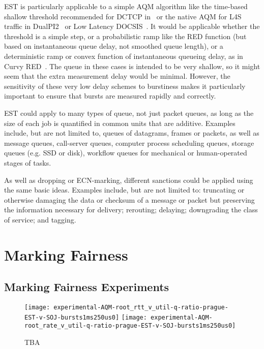 EST is particularly applicable to a simple AQM algorithm like the time-based shallow threshold recommended for DCTCP in~\cite{Bai16:MQ-ECN} or the native AQM for L4S traffic in DualPI2~\cite[Appx.\ A]{Briscoe15e:DualQ-Coupled-AQM_ID} or Low Latency DOCSIS~\cite{CableLabs:DOCSIS3.1}. It would be applicable whether the threshold is a simple step, or a probabilistic ramp like the RED function (but based on instantaneous queue delay, not smoothed queue length), or a deterministic ramp or convex function of instantaneous queueing delay, as in Curvy RED~\cite[Appx.\ B]{Briscoe15e:DualQ-Coupled-AQM_ID}. The queue in these cases is intended to be very shallow, so it might seem that the extra measurement delay would be minimal. However, the sensitivity of these very low delay schemes to burstiness makes it particularly important to ensure that bursts are measured rapidly and correctly.

EST could apply to many types of queue, not just packet queues, as long as the size of each job is quantified in common units that are additive. Examples include, but are not limited to, queues of datagrams, frames or packets, as well as message queues, call-server queues, computer process scheduling queues, storage queues (e.g. SSD or disk), workflow queues for mechanical or human-operated stages of tasks. 

As well as dropping or ECN-marking, different sanctions could be applied using the same basic ideas. Examples include, but are not limited to: truncating or otherwise damaging the data or checksum of a message or packet but preserving the information necessary for delivery; rerouting; delaying; downgrading the class of service; and tagging.

\section{Marking Fairness}\label{sec:marking_fairness_discuss}

\subsection{Marking Fairness Experiments}\label{sec:marking_fairness_expts}

\begin{figure*}
	\centering
	\texttt{[image: experimental-AQM-root\_rtt\_v\_util-q-ratio-prague-EST-v-SOJ-bursts1ms250us0]}
	\texttt{[image: experimental-AQM-root\_rate\_v\_util-q-ratio-prague-EST-v-SOJ-bursts1ms250us0]}
	\caption{TBA}
\end{figure*}

